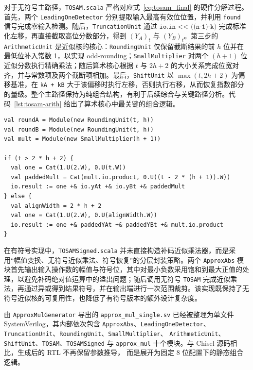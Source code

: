 \documentclass[12pt,a4paper,UTF8]{article}
\begin{document}
对于无符号主路径，\texttt{TOSAM.scala} 严格对应式~\eqref{eq:tosam_final} 的硬件分解过程。首先，两个 \texttt{LeadingOneDetector} 分别提取输入最高有效位位置，并利用 \texttt{found} 信号完成零输入检测。随后，\texttt{TruncationUnit} 通过
\(
\texttt{io.in << ((n-1)-k)}
\)
完成标准化左移，再直接截取高位分数部分，得到 $(Y_A)_t$ 与 $(Y_B)_t$。第三步的 \texttt{ArithmeticUnit} 是近似核的核心：\texttt{RoundingUnit} 仅保留截断结果的前 $h$ 位并在最低位补入常数 1，以实现 odd-rounding；\texttt{SmallMultiplier} 对两个 $(h+1)$ 位近似分数执行精确乘法；随后算术核心根据 $t$ 与 $2h+2$ 的大小关系完成位宽对齐，并与常数项及两个截断项相加。最后，\texttt{ShiftUnit} 以 $\max(t,2h+2)$ 为偏移基准，在 \texttt{kA + kB} 大于该偏移时执行左移，否则执行右移，从而恢复指数部分的量级。整个主路径保持为纯组合结构，有利于后续综合与关键路径分析。代码~\ref{lst:tosam-arith} 给出了算术核心中最关键的组合逻辑。

\begin{lstlisting}[caption={ArithmeticUnit 的关键组合逻辑},label={lst:tosam-arith},basicstyle=\ttfamily\small]
val roundA = Module(new RoundingUnit(t, h))
val roundB = Module(new RoundingUnit(t, h))
val mult = Module(new SmallMultiplier(h + 1))

if (t > 2 * h + 2) {
  val one = Cat(1.U(2.W), 0.U(t.W))
  val paddedMult = Cat(mult.io.product, 0.U((t - 2 * (h + 1)).W))
  io.result := one +& io.yAt +& io.yBt +& paddedMult
} else {
  val alignWidth = 2 * h + 2
  val one = Cat(1.U(2.W), 0.U(alignWidth.W))
  io.result := one +& paddedYAt +& paddedYBt +& mult.io.product
}
\end{lstlisting}

在有符号实现中，\texttt{TOSAMSigned.scala} 并未直接构造补码近似乘法器，而是采用“幅值变换、无符号近似乘法、符号恢复”的分层封装策略。两个 \texttt{ApproxAbs} 模块首先输出输入操作数的幅值与符号位，其中对最小负数采用饱和到最大正值的处理，以避免补码绝对值运算中的溢出问题；随后调用无符号 \texttt{TOSAM} 完成近似乘法，再通过异或得到结果符号，并在输出端进行一次范围裁剪。该实现既保持了无符号近似核的可复用性，也降低了有符号版本的额外设计复杂度。

由 \texttt{ApproxMulGenerator} 导出的 \texttt{approx\_mul\_single.sv} 已经被整理为单文件
 SystemVerilog，其内部依次包含 \texttt{ApproxAbs}、\texttt{LeadingOneDetector}、
 \texttt{TruncationUnit}、\texttt{RoundingUnit}、\texttt{SmallMultiplier}、
 \texttt{ArithmeticUnit}、\texttt{ShiftUnit}、\texttt{TOSAM}、\texttt{TOSAMSigned} 
 与 \texttt{approx\_mul} 十个模块。与 Chisel 源码相比，生成后的 RTL 不再保留参数推导，
 而是展开为固定 8 位配置下的静态组合逻辑。
\end{document}
